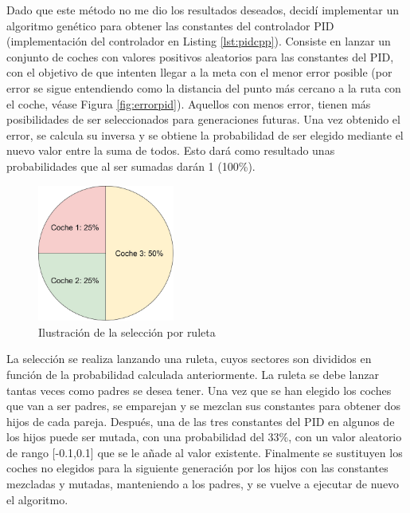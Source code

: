 \bigskip

Dado que este método no me dio los resultados deseados, decidí implementar un algoritmo genético para obtener las constantes del controlador PID (implementación del controlador en Listing \ref{lst:pidcpp}). Consiste en lanzar un conjunto de coches con valores positivos aleatorios para las constantes del PID, con el objetivo de que intenten llegar a la meta con el menor error posible (por error se sigue entendiendo como la distancia del punto más cercano a la ruta con el coche, véase Figura \ref{fig:errorpid}). Aquellos con menos error, tienen más posibilidades de ser seleccionados para generaciones futuras. Una vez obtenido el error, se calcula su inversa y se obtiene la probabilidad de ser elegido mediante el nuevo valor entre la suma de todos. Esto dará como resultado unas probabilidades que al ser sumadas darán 1 (100\%). 

\bigskip
\begin{figure}[H]
    \centering
    \includegraphics[width=0.4\textwidth]{imagenes/converted/ruleta.jpg}
    \caption{Ilustración de la selección por ruleta}
    \label{fig:ruleta}
\end{figure}

La selección se realiza lanzando una ruleta\cite{gaperformance}, cuyos sectores son divididos en función de la probabilidad calculada anteriormente. La ruleta se debe lanzar tantas veces como padres se desea tener. Una vez que se han elegido los coches que van a ser padres, se emparejan y se mezclan sus constantes para obtener dos hijos de cada pareja. Después, una de las tres constantes del PID en algunos de los hijos puede ser mutada, con una probabilidad del 33\%, con un valor aleatorio de rango [-0.1,0.1] que se le añade al valor existente. Finalmente se sustituyen los coches no elegidos para la siguiente generación por los hijos con las constantes mezcladas y mutadas, manteniendo a los padres, y se vuelve a ejecutar de nuevo el algoritmo.

